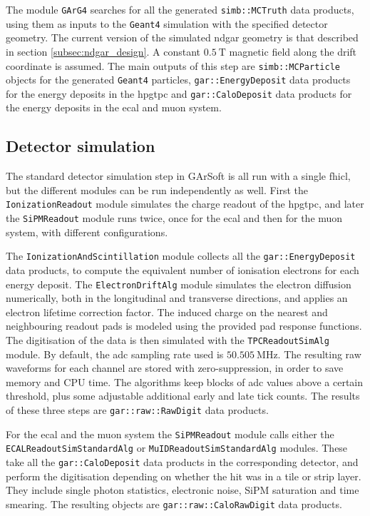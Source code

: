 The module \texttt{GArG4} searches for all the generated \texttt{simb::MCTruth} data products, using them as inputs to the \texttt{Geant4} simulation with the specified detector geometry. The current version of the simulated \gls{ndgar} geometry is that described in section \ref{subsec:ndgar_design}. A constant $0.5~\mathrm{T}$ magnetic field along the drift coordinate is assumed. The main outputs of this step are \texttt{simb::MCParticle} objects for the generated \texttt{Geant4} particles, \texttt{gar::EnergyDeposit} data products for the energy deposits in the \gls{hpgtpc} and \texttt{gar::CaloDeposit} data products for the energy deposits in the \gls{ecal} and muon system.

\subsection{Detector simulation}

The standard detector simulation step in GArSoft is all run with a single \gls{fhicl}, but the different modules can be run independently as well. First the \texttt{IonizationReadout} module simulates the charge readout of the \gls{hpgtpc}, and later the \texttt{SiPMReadout} module runs twice, once for the \gls{ecal} and then for the muon system, with different configurations.

The \texttt{IonizationAndScintillation} module collects all the \texttt{gar::EnergyDeposit} data products, to compute the equivalent number of ionisation electrons for each energy deposit. The \texttt{ElectronDriftAlg} module simulates the electron diffusion numerically, both in the longitudinal and transverse directions, and applies an electron lifetime correction factor. The induced charge on the nearest and neighbouring readout pads is modeled using the provided pad response functions. The digitisation of the data is then simulated with the \texttt{TPCReadoutSimAlg} module. By default, the \gls{adc} sampling rate used is $50.505~\mathrm{MHz}$. The resulting raw waveforms for each channel are stored with zero-suppression, in order to save memory and CPU time. The algorithms keep blocks of \gls{adc} values above a certain threshold, plus some adjustable additional early and late tick counts. The results of these three steps are \texttt{gar::raw::RawDigit} data products.

For the \gls{ecal} and the muon system the \texttt{SiPMReadout} module calls either the \texttt{ECALReadoutSimStandardAlg} or \texttt{MuIDReadoutSimStandardAlg} modules. These take all the \texttt{gar::CaloDeposit} data products in the corresponding detector, and perform the digitisation depending on whether the hit was in a tile or strip layer. They include single photon statistics, electronic noise, SiPM saturation and time smearing. The resulting objects are \texttt{gar::raw::CaloRawDigit} data products.

